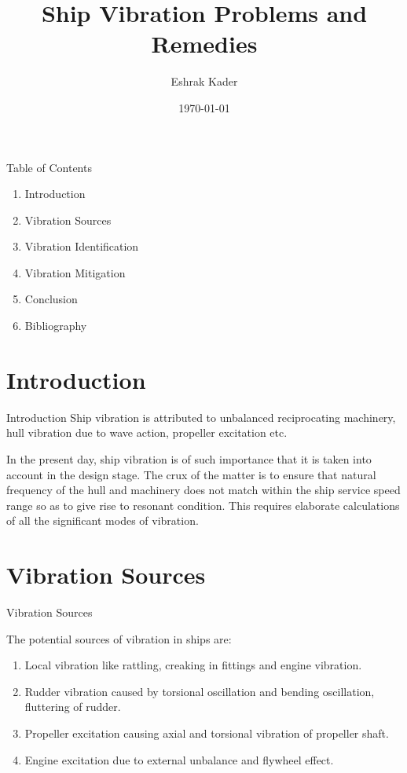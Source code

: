 \documentclass{beamer}
\title{Ship Vibration Problems and Remedies}
\author{Eshrak Kader}
\date{\today}
\begin{document}

\begin{frame}
\titlepage
\end{frame}

\begin{frame}[t]{Table of Contents}\vspace{10pt}
\begin{enumerate}
\item Introduction
\item Vibration Sources
\item Vibration Identification
\item Vibration Mitigation
\item Conclusion
\item Bibliography
\end{enumerate}
\end{frame}

\section{Introduction}
	\begin{frame}[t]{Introduction}\vspace{10pt}
	Ship vibration is attributed to unbalanced 						reciprocating machinery, hull vibration due to wave action, 		propeller excitation etc.\vspace{10pt}

	In the present day, ship vibration is of such importance 			that it is taken into account in the design stage. The crux 		of the matter is to ensure that natural frequency of the 			hull and machinery does not match within the ship service 			speed range so as to give rise to resonant condition. This 			requires elaborate calculations of all the significant modes 		of vibration.
	\end{frame}

\section{Vibration Sources}
	\begin{frame}[t]{Vibration Sources}\vspace{10pt}
	\begin{block}{The potential sources of vibration in ships 			are:}
	\end{block}
	\begin{enumerate}
	\item Local vibration like rattling, creaking in fittings and 	engine vibration.
	\item Rudder vibration caused by torsional oscillation and 			bending oscillation, fluttering of rudder.
	\item Propeller excitation causing axial and torsional 				vibration of propeller shaft.
	\item Engine excitation due to external unbalance and 				flywheel effect.
	\end{enumerate}
	\end{frame}
\end{document}
